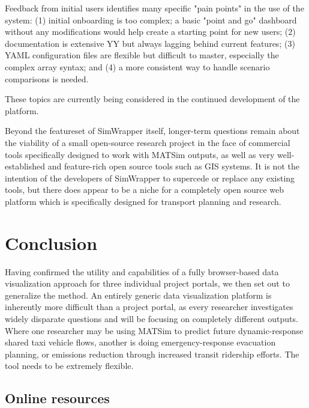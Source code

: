 \documentclass[3p,times,procedia]{elsarticle}
\begin{document}
Feedback from initial users identifies many specific "pain points" in the use of the system: (1) initial onboarding is too complex; a basic "point and go" dashboard without any modifications would help create a starting point for new users; (2) documentation is extensive YY but always lagging behind current features; (3) YAML configuration files are flexible but difficult to master, especially the complex array syntax; and (4) a more consistent way to handle scenario comparisons is needed.

These topics are currently being considered in the continued development of the platform.

Beyond the featureset of SimWrapper itself, longer-term questions remain about the viability of a small open-source research project in the face of commercial tools specifically designed to work with MATSim outputs, as well as very well-established and feature-rich open source tools such as GIS systems. It is not the intention of the developers of SimWrapper to supercede or replace any existing tools, but there does appear to be a niche for a completely open source web platform which is specifically designed for transport planning and research.


\section{Conclusion}

Having confirmed the utility and capabilities of a fully browser-based data visualization approach for three individual project portals, we then set out to generalize the method. An entirely generic data visualization platform is inherently more difficult than a project portal, as every researcher investigates widely disparate questions and will be focusing on completely different outputs. Where one researcher may be using MATSim to predict future dynamic-response shared taxi vehicle flows, another is doing emergency-response evacuation planning, or emissions reduction through increased transit ridership efforts. The tool needs to be extremely flexible.

\subsection{Online resources}
\end{document}
